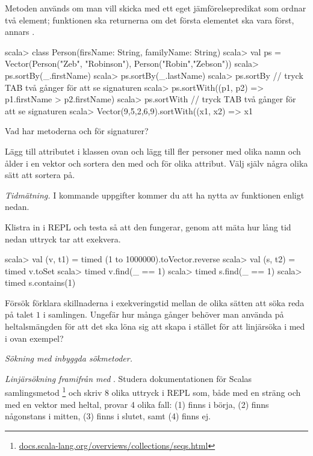 Metoden  används om man vill skicka med ett eget jämförelsepredikat som ordnar två element; funktionen ska returnerna  om det första elementet ska vara först, annars .

\begin{REPL}
scala> class Person(firsName: String, familyName: String)
scala> val ps = Vector(Person("Zeb", "Robinson"), Person("Robin","Zebson")) 
scala> ps.sortBy(_.firstName)
scala> ps.sortBy(_.lastName)
scala> ps.sortBy  // tryck TAB två gånger för att se signaturen
scala> ps.sortWith((p1, p2) => p1.firstName > p2.firstName) 
scala> ps.sortWith  // tryck TAB två gånger för att se signaturen
scala> Vector(9,5,2,6,9).sortWith((x1, x2) => x1 %
\end{REPL}
Vad har metoderna  och  för signaturer? 

\Subtask Lägg till attributet  i klassen  ovan och lägg till fler personer med olika namn och ålder i en vektor och sortera den med  och  för olika attribut. Välj själv några olika sätt att sortera på. 



\Task \label{task:timed}\emph{Tidmätning.} I kommande uppgifter kommer du att ha nytta av funktionen  enligt nedan. 
\Subtask Klistra in  i REPL och testa så att den fungerar, genom att mäta hur lång tid nedan uttryck tar att exekvera. 
\begin{REPL}
scala> val (v, t1) = timed{ (1 to 1000000).toVector.reverse }
scala> val (s, t2) = timed{ v.toSet } 
scala> timed{ v.find(_ == 1) } 
scala> timed{ s.find(_ == 1) } 
scala> timed{ s.contains(1) } 
\end{REPL} 
\Subtask\Pen Försök förklara skillnaderna i exekveringstid mellan de olika sätten att söka reda på  talet $1$ i samlingen. Ungefär hur många gånger behöver man använda  på heltalsmängden  för att det ska löna sig att skapa  i stället för att linjärsöka i  med  i ovan exempel?


\Task \emph{Sökning med inbyggda sökmetoder.} 

\Subtask \emph{Linjärsökning framifrån med }. Studera dokumentationen för Scalas samlingsmetod \footnote{\href{http://docs.scala-lang.org/overviews/collections/seqs.html}{docs.scala-lang.org/overviews/collections/seqs.html}} och skriv 8 olika uttryck i REPL som, både med en sträng och med en vektor med heltal, provar 4 olika fall: (1) finns i börja, (2) finns någonstans i mitten, (3) finns i slutet, samt (4) finns ej.

